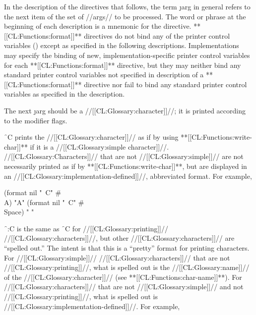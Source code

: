 In the description of the directives that follows, the term \j{arg} in general refers to the next item of the set of //args// to be processed. The word or phrase at the beginning of each description is a mnemonic for the directive.  **[[CL:Functions:format]]** directives do not bind any of the printer control variables () except as specified in the following descriptions.
   Implementations may specify the binding of new, implementation-specific  printer control variables for each **[[CL:Functions:format]]** directive, but they
    may neither bind any standard printer control variables not
    specified in description of a **[[CL:Functions:format]]**  directive nor fail to bind
    any standard printer control variables as specified in the
    description.


 

                The next \j{arg} should be a //[[CL:Glossary:character]]//;  it is printed according to the modifier flags.

 \f{~C} prints the //[[CL:Glossary:character]]//  as if by using **[[CL:Functions:write-char]]** if it is a //[[CL:Glossary:simple character]]//. //[[CL:Glossary:Characters]]// that are not //[[CL:Glossary:simple]]// are not necessarily printed as if by **[[CL:Functions:write-char]]**, but are displayed in an //[[CL:Glossary:implementation-defined]]//, abbreviated format. For example,

\code
 (format nil "~C" #\\A) \EV "A"
 (format nil "~C" #\\Space) \EV " " \endcode

\f{~:C} is the same as \f{~C} for //[[CL:Glossary:printing]]// //[[CL:Glossary:characters]]//, but other //[[CL:Glossary:characters]]// are ``spelled out.''  The intent is that this is a ``pretty'' format for printing characters. For //[[CL:Glossary:simple]]// //[[CL:Glossary:characters]]// that are not //[[CL:Glossary:printing]]//, what is spelled out is the //[[CL:Glossary:name]]// of the //[[CL:Glossary:character]]// (see **[[CL:Functions:char-name]]**). For //[[CL:Glossary:characters]]// that are not //[[CL:Glossary:simple]]// and not //[[CL:Glossary:printing]]//, what is spelled out is //[[CL:Glossary:implementation-defined]]//. For example, 

